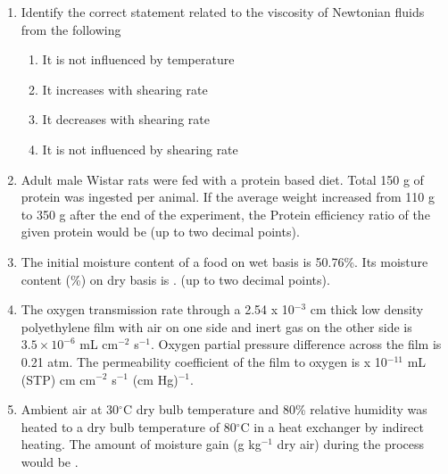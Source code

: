 \documentclass[a4paper,10pt]{article}
\begin{document}
\begin{enumerate}
    \item Identify the correct statement related to the viscosity of Newtonian fluids from the following
    \hfill{}
    \begin{enumerate}[label=\Alph*)]
        \item It is not influenced by temperature
        \item It increases with shearing rate
        \item It decreases with shearing rate
        \item It is not influenced by shearing rate
    \end{enumerate}

    \item Adult male Wistar rats were fed with a protein based diet. Total 150 g of protein was ingested per animal. If the average weight increased from 110 g to 350 g after the end of the experiment, the Protein efficiency ratio of the given protein would be \underline{\hspace{2cm}} (up to two decimal points).
    \hfill{}

    \item The initial moisture content of a food on wet basis is 50.76\%. Its moisture content (\%) on dry basis is \underline{\hspace{2cm}}. (up to two decimal points).
    \hfill{}

    \item The oxygen transmission rate through a 2.54 x 10$^{-3}$ cm thick low density polyethylene film with air on one side and inert gas on the other side is $3.5 \times 10^{-6}$ mL cm$^{-2}$ s$^{-1}$. Oxygen partial pressure difference across the film is 0.21 atm. The permeability coefficient of the film to oxygen is \underline{\hspace{2cm}} x 10$^{-11}$ mL (STP) cm cm$^{-2}$ s$^{-1}$ (cm Hg)$^{-1}$.
    \hfill{}

    \item Ambient air at 30$^{\circ}$C dry bulb temperature and 80\% relative humidity was heated to a dry bulb temperature of 80$^{\circ}$C in a heat exchanger by indirect heating. The amount of moisture gain (g kg$^{-1}$ dry air) during the process would be \underline{\hspace{2cm}}.
    \hfill{}


\end{enumerate}
\end{document}
